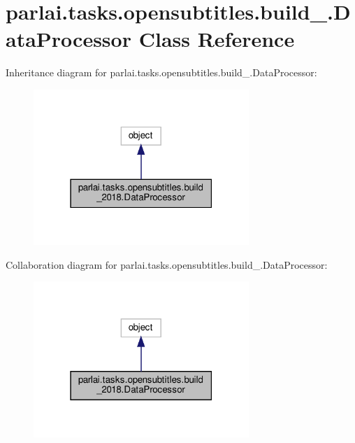 \hypertarget{classparlai_1_1tasks_1_1opensubtitles_1_1build__2018_1_1DataProcessor}{}\section{parlai.\+tasks.\+opensubtitles.\+build\+\_.\+Data\+Processor Class Reference}
\label{classparlai_1_1tasks_1_1opensubtitles_1_1build__2018_1_1DataProcessor}


Inheritance diagram for parlai.\+tasks.\+opensubtitles.\+build\+\_.\+Data\+Processor\+:\nopagebreak
\begin{figure}[H]
\begin{center}
\leavevmode
\includegraphics[width=231pt]{dc/db0/classparlai_1_1tasks_1_1opensubtitles_1_1build__2018_1_1DataProcessor__inherit__graph}
\end{center}
\end{figure}


Collaboration diagram for parlai.\+tasks.\+opensubtitles.\+build\+\_.\+Data\+Processor\+:\nopagebreak
\begin{figure}[H]
\begin{center}
\leavevmode
\includegraphics[width=231pt]{d9/d76/classparlai_1_1tasks_1_1opensubtitles_1_1build__2018_1_1DataProcessor__coll__graph}
\end{center}
\end{figure}
